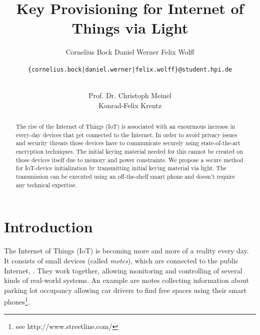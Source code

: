 \documentclass{sig-alternate} %
\begin{document}
\title{Key Provisioning for Internet of Things via Light}


\author{
\alignauthor
Cornelius Bock
%
\alignauthor
Daniel Werner
%
\alignauthor
Felix Wolff
%
\and
\texttt{\{cornelius.bock|daniel.werner|felix.wolff\}@student.hpi.de} \\ \\
\and
\alignauthor
Prof. Dr. Christoph Meinel\\
%
\alignauthor
Konrad-Felix Krentz\\
}

\maketitle

\begin{abstract}
The rise of the Internet of Things (IoT) is associated with an enourmous increase in every-day devices that get connected to the Internet.
In order to avoid privacy issues and security threats those devices have to communicate securely using state-of-the-art encryption techniques.
The initial keying material needed for this cannot be created on those devices itself due to memory and power constraints.
We propose a secure method for IoT-device initialization by transmitting initial keying material via light.
The transmission can be executed using an off-the-shelf smart phone and doesn't require any technical expertise.
\end{abstract}




\section{Introduction}
\label{sec:introduction}

The Internet of Things (IoT) is becoming more and more of a reality every day.
It consists of small devices (called \textit{motes}), which are connected to the public Internet, \cite{atzori2010internet}.
They work together, allowing monitoring and controlling of several kinds of real-world systems.
An example are motes collecting information about parking lot occupancy allowing car drivers to find free spaces using their smart phones\footnote{see http://www.streetline.com/}.
\end{document}
